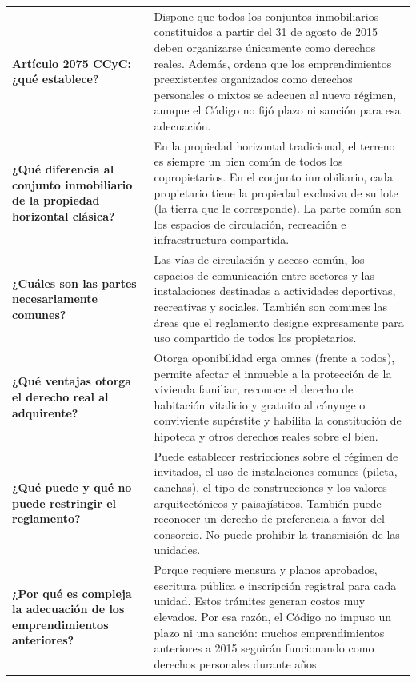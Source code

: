 \documentclass[12pt,oneside]{book}
\begin{document}
\begin{longtable}{
    >{\raggedright\arraybackslash}p{}
    >{\raggedright\arraybackslash}p{}
}
\textbf{Artículo 2075 CCyC: ¿qué establece?} &
Dispone que todos los conjuntos inmobiliarios constituidos a partir del 31 de agosto de 2015 deben organizarse únicamente como derechos reales. Además, ordena que los emprendimientos preexistentes organizados como derechos personales o mixtos se adecuen al nuevo régimen, aunque el Código no fijó plazo ni sanción para esa adecuación. \\[0.6em]

\textbf{¿Qué diferencia al conjunto inmobiliario de la propiedad horizontal clásica?} &
En la propiedad horizontal tradicional, el terreno es siempre un bien común de todos los copropietarios. En el conjunto inmobiliario, cada propietario tiene la propiedad exclusiva de su lote (la tierra que le corresponde). La parte común son los espacios de circulación, recreación e infraestructura compartida. \\[0.6em]

\textbf{¿Cuáles son las partes necesariamente comunes?} &
Las vías de circulación y acceso común, los espacios de comunicación entre sectores y las instalaciones destinadas a actividades deportivas, recreativas y sociales. También son comunes las áreas que el reglamento designe expresamente para uso compartido de todos los propietarios. \\[0.6em]

\textbf{¿Qué ventajas otorga el derecho real al adquirente?} &
Otorga oponibilidad erga omnes (frente a todos), permite afectar el inmueble a la protección de la vivienda familiar, reconoce el derecho de habitación vitalicio y gratuito al cónyuge o conviviente supérstite y habilita la constitución de hipoteca y otros derechos reales sobre el bien. \\[0.6em]

\textbf{¿Qué puede y qué no puede restringir el reglamento?} &
Puede establecer restricciones sobre el régimen de invitados, el uso de instalaciones comunes (pileta, canchas), el tipo de construcciones y los valores arquitectónicos y paisajísticos. También puede reconocer un derecho de preferencia a favor del consorcio. No puede prohibir la transmisión de las unidades. \\[0.6em]

\textbf{¿Por qué es compleja la adecuación de los emprendimientos anteriores?} &
Porque requiere mensura y planos aprobados, escritura pública e inscripción registral para cada unidad. Estos trámites generan costos muy elevados. Por esa razón, el Código no impuso un plazo ni una sanción: muchos emprendimientos anteriores a 2015 seguirán funcionando como derechos personales durante años. \\[0.6em]


\end{longtable}
\end{document}

